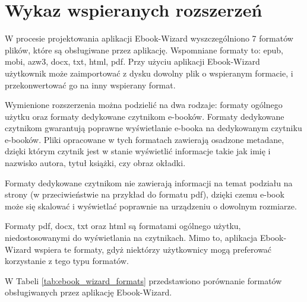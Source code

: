 \section{Wykaz wspieranych rozszerzeń}

W procesie projektowania aplikacji Ebook-Wizard wyszczególniono 7 formatów plików, które są obsługiwane przez aplikację. Wspomniane formaty to: epub, mobi, azw3, docx, txt, html, pdf. Przy użyciu aplikacji Ebook-Wizard użytkownik może zaimportować z dysku dowolny plik o wspieranym formacie, i przekonwertować go na inny wspierany format.

Wymienione rozszerzenia można podzielić na dwa rodzaje: formaty ogólnego użytku oraz formaty dedykowane czytnikom e-booków. Formaty dedykowane czytnikom gwarantują poprawne wyświetlanie e-booka na dedykowanym czytniku e-booków. Pliki opracowane w tych formatach zawierają osadzone metadane, dzięki którym czytnik jest w stanie wyświetlić informacje takie jak imię i nazwisko autora, tytuł książki, czy obraz okładki.

Formaty dedykowane czytnikom nie zawierają informacji na temat podziału na strony (w przeciwieństwie na przykład do formatu pdf), dzięki czemu e-book może się skalować i wyświetlać poprawnie na urządzeniu o dowolnym rozmiarze. \cite{format_comparision}

Formaty pdf, docx, txt oraz html są formatami ogólnego użytku, niedostosowanymi do wyświetlania na czytnikach. Mimo to, aplikacja Ebook-Wizard wspiera te formaty, gdyż niektórzy użytkownicy mogą preferować korzystanie z tego typu formatów.

W Tabeli \ref{tab:ebook_wizard_formats} przedstawiono porównanie formatów obsługiwanych przez aplikację Ebook-Wizard.

